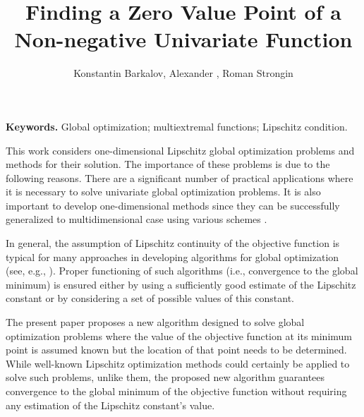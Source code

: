 \documentclass[oribibl]{llncs}
\begin{document}
\cleardoublepage

\title{Finding a Zero Value Point of a Non-negative Univariate Function}
\author{Konstantin Barkalov, Alexander 	, Roman Strongin}



\maketitle

\thispagestyle{fancy}

\textbf{Keywords.} Global optimization; multiextremal functions; Lipschitz condition.

 \vspace*{0.5cm}


This work considers one-dimensional Lipschitz global optimization problems and methods for their solution. The importance of these problems is due to the following reasons.
There are a significant number of practical applications where it is necessary to solve univariate global optimization problems. It is also important to develop  one-dimensional methods since they can be successfully generalized to multidimensional case using various schemes \cite{Sergeyev2013,Sergeyev2017}.

In general, the assumption of Lipschitz continuity of the objective function is typical for many approaches in developing algorithms for global optimization (see, e.g., \cite{Evtushenko2013,Jones2021}). Proper functioning of such algorithms (i.e., convergence to the global minimum) is ensured either by using a sufficiently good estimate of the Lipschitz constant or by considering a set of possible values of this constant.

The present paper proposes a new algorithm designed to solve global optimization problems where the value of the objective function at its minimum point is assumed known but the location of that point needs to be determined. While well-known Lipschitz optimization methods could certainly be applied to solve such problems, unlike them, the proposed new algorithm guarantees convergence to the global minimum of the objective function without requiring any estimation of the Lipschitz constant's value.
\end{document}
